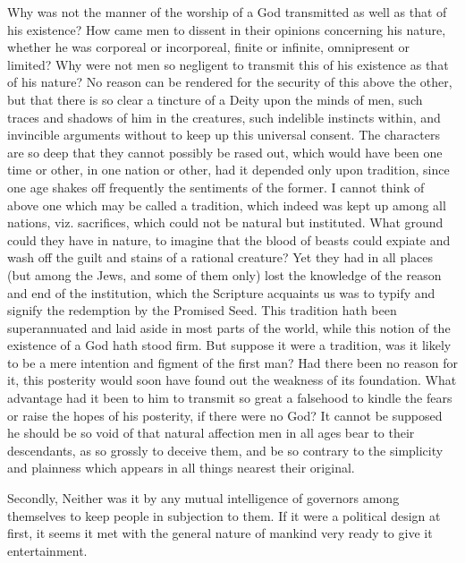 \documentclass[a5paper]{book}
\begin{document}
Why was not the manner of the worship of a God transmitted as
well as that of his existence? How came men to dissent in their
opinions concerning his nature, whether he was corporeal or 
incorporeal, finite or infinite, omnipresent or limited? Why were not men
so negligent to transmit this of his existence as that of his nature?
No reason can be rendered for the security of this above the other,
but that there is so clear a tincture of a Deity upon the minds of
men, such traces and shadows of him in the creatures, such indelible
instincts within, and invincible arguments without to keep up this %
universal consent. The characters are so deep that they cannot
possibly be rased out, which would have been one time or other, in
one nation or other, had it depended only upon tradition, since one
age shakes off frequently the sentiments of the former. I cannot
think of above one which may be called a tradition, which indeed
was kept up among all nations, viz. sacrifices, which could not be
natural but instituted. What ground could they have in nature, to
imagine that the blood of beasts could expiate and wash off the guilt
and stains of a rational creature? Yet they had in all places (but
among the Jews, and some of them only) lost the knowledge of the
reason and end of the institution, which the Scripture acquaints us
was to typify and signify the redemption by the Promised Seed.
This tradition hath been superannuated and laid aside in most parts
of the world, while this notion of the existence of a God hath stood
firm. But suppose it were a tradition, was it likely to be a mere
intention and figment of the first man? Had there been no reason for
it, this posterity would soon have found out the weakness of its foundation. 
What advantage had it been to him to transmit so great a
falsehood to kindle the fears or raise the hopes of his posterity, if
there were no God? It cannot be supposed he should be so void
of that natural affection men in all ages bear to their descendants,
as so grossly to deceive them, and be so contrary to the simplicity
and plainness which appears in all things nearest their original.

Secondly, Neither was it by any mutual intelligence of governors
among themselves to keep people in subjection to them. If it were
a political design at first, it seems it met with the general nature of
mankind very ready to give it entertainment.
\end{document}
